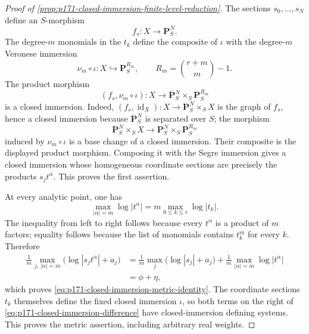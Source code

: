 
\begin{proof}[Proof of
\cref{prop:p171-closed-immersion-finite-level-reduction}]
The sections \(s_0,\ldots,s_N\) define an \(S\)-morphism
\[
                         f_s:X\longrightarrow\mathbf P^N_S.
\]
The degree-\(m\) monomials in the \(t_k\) define the composite of
\(\iota\) with the degree-\(m\) Veronese immersion
\[
       \nu_m\circ\iota:X\hookrightarrow\mathbf P^{R_m}_S,
       \qquad R_m=\binom{r+m}{m}-1.
\]
The product morphism
\[
        (f_s,\nu_m\circ\iota):X
        \longrightarrow\mathbf P^N_S\times_S\mathbf P^{R_m}_S
\]
is a closed immersion.  Indeed,
\((f_s,\operatorname{id}_X):X\to\mathbf P^N_S\times_S X\) is the graph
of \(f_s\), hence a closed immersion because \(\mathbf P^N_S\) is
separated over \(S\); the morphism
\[
 \mathbf P^N_S\times_S X
 \longrightarrow
 \mathbf P^N_S\times_S\mathbf P^{R_m}_S
\]
induced by \(\nu_m\circ\iota\) is a base change of a closed immersion.
Their composite is the displayed product morphism.  Composing it with the
Segre immersion gives a closed immersion whose homogeneous coordinate
sections are precisely the products \(s_jt^\alpha\).  This proves the
first assertion.

At every analytic point, one has
\[
 \max_{|\alpha|=m}\log|t^\alpha|
 =m\max_{0\leq k\leq r}\log|t_k|.
\]
The inequality from left to right follows because every \(t^\alpha\) is a
product of \(m\) factors; equality follows because the list of monomials
contains \(t_k^m\) for every \(k\).  Therefore
\begin{align*}
 \frac1m\max_{j,\,|\alpha|=m}
      \bigl(\log|s_jt^\alpha|+a_j\bigr)
 &=\frac1m\max_j\bigl(\log|s_j|+a_j\bigr)
   +\frac1m\max_{|\alpha|=m}\log|t^\alpha|\\
 &=\phi+\eta,
\end{align*}
which proves \eqref{eq:p171-closed-immersion-metric-identity}.  The
coordinate sections \(t_k\) themselves define the fixed closed immersion
\(\iota\), so both terms on the right of
\eqref{eq:p171-closed-immersion-difference} have closed-immersion defining
systems.  This proves the metric assertion, including arbitrary real
weights.


\end{proof}
